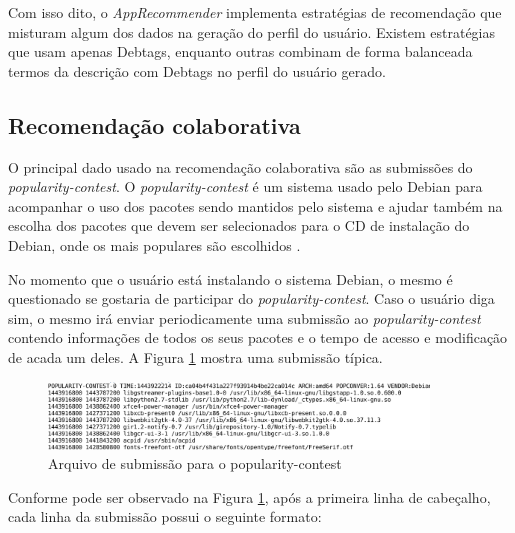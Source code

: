 Com isso dito, o \textit{AppRecommender} implementa estratégias de recomendação que
misturam algum dos dados na geração do perfil do usuário. Existem estratégias
que usam apenas Debtags, enquanto outras combinam de forma balanceada termos da
descrição com Debtags no perfil do usuário gerado.


\subsection{Recomendação colaborativa}

O principal dado usado na recomendação colaborativa são as submissões do
\textit{popularity-contest}. O \textit{popularity-contest} é um sistema usado pelo Debian para
acompanhar o uso dos pacotes sendo mantidos pelo sistema e ajudar também na
escolha dos pacotes que devem ser selecionados para o CD de instalação do
Debian, onde os mais populares são escolhidos \cite{araujo2011apprecommender}.

No momento que o usuário está instalando o sistema Debian, o mesmo é
questionado se gostaria de participar do
\textit{popularity-contest}. Caso o usuário diga sim, o mesmo irá enviar periodicamente
uma submissão ao \textit{popularity-contest} contendo informações de todos os seus
pacotes e o tempo de acesso e modificação de acada um deles. A Figura
\ref{fig:submissao_popcon} mostra uma submissão típica.

\begin{figure}[h]
  \centering
  \includegraphics[width=0.9\textwidth]{figuras/submissao_popcon.eps}
  \caption{Arquivo de submissão para o popularity-contest}
  \label{fig:submissao_popcon}
\end{figure}

Conforme pode ser observado na Figura \ref{fig:submissao_popcon}, após a
primeira linha de cabeçalho, cada linha da submissão possui o seguinte formato:

